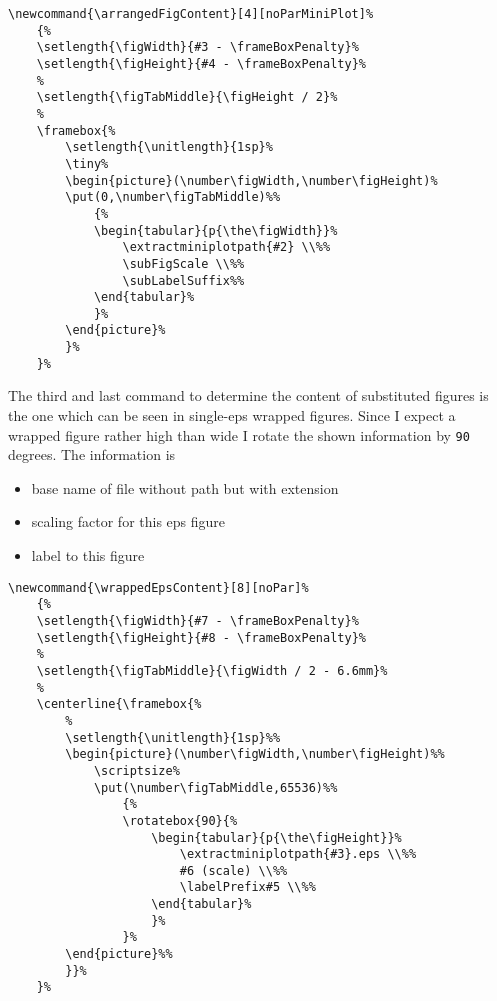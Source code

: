 \documentclass[12pt,a4paper]{article}
\newcommand{\comm}[1]{\texttt{#1}}
\begin{document}
\begin{verbatim}
\newcommand{\arrangedFigContent}[4][noParMiniPlot]%
    {%
    \setlength{\figWidth}{#3 - \frameBoxPenalty}%
    \setlength{\figHeight}{#4 - \frameBoxPenalty}%
    %
    \setlength{\figTabMiddle}{\figHeight / 2}%
    %
    \framebox{%
        \setlength{\unitlength}{1sp}%
        \tiny%
        \begin{picture}(\number\figWidth,\number\figHeight)%
        \put(0,\number\figTabMiddle)%%
            {%
            \begin{tabular}{p{\the\figWidth}}%
                \extractminiplotpath{#2} \\%%
                \subFigScale \\%%
                \subLabelSuffix%%
            \end{tabular}%
            }%
        \end{picture}%    
        }%
    }%
\end{verbatim}

The third and last command to determine the content of substituted figures is the one which can 
be seen in single-eps wrapped figures. Since I expect a wrapped figure rather high than wide I
rotate the shown information by \comm{90} degrees. The information is 

\begin{itemize}
  \item base name of file without path but with extension
  \item scaling factor for this eps figure
  \item label to this figure
\end{itemize}

\begin{verbatim}
\newcommand{\wrappedEpsContent}[8][noPar]%
    {%
    \setlength{\figWidth}{#7 - \frameBoxPenalty}%
    \setlength{\figHeight}{#8 - \frameBoxPenalty}%
    %
    \setlength{\figTabMiddle}{\figWidth / 2 - 6.6mm}%
    %
    \centerline{\framebox{%
        %
        \setlength{\unitlength}{1sp}%%
        \begin{picture}(\number\figWidth,\number\figHeight)%%
            \scriptsize%
            \put(\number\figTabMiddle,65536)%%
                {%
                \rotatebox{90}{%
                    \begin{tabular}{p{\the\figHeight}}%
                        \extractminiplotpath{#3}.eps \\%%
                        #6 (scale) \\%%
                        \labelPrefix#5 \\%%
                    \end{tabular}%
                    }%
                }%
        \end{picture}%%
        }}%
    }%
\end{verbatim}
\end{document}
